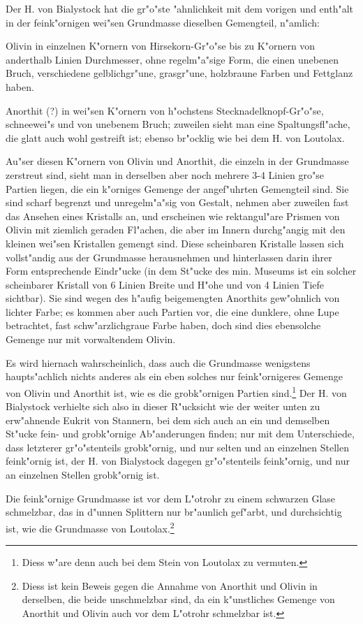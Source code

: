 \documentclass[a4paper, 11pt, oneside]{article}
\begin{document}
Der H. von Bialystock hat die gr"o"ste "ahnlichkeit mit dem vorigen und enth"alt in der feink"ornigen wei"sen Grundmasse dieselben Gemengteil, n"amlich:

Olivin in einzelnen K"ornern von Hirsekorn-Gr"o"se bis zu K"ornern von anderthalb Linien Durchmesser, ohne regelm"a"sige Form, die einen unebenen Bruch, verschiedene gelblichgr"une, grasgr"une, holzbraune Farben und Fettglanz haben.

Anorthit (?) in wei"sen K"ornern von h"ochstens Stecknadelknopf-Gr"o"se, schneewei"s und von unebenem Bruch; zuweilen sieht man eine Spaltungsfl"ache, die glatt auch wohl gestreift ist; ebenso br"ocklig wie bei dem H. von Loutolax.

Au"ser diesen K"ornern von Olivin und Anorthit, die einzeln in der Grundmasse zerstreut sind, sieht man in derselben aber noch mehrere 3-4 Linien gro"se Partien liegen, die ein k"orniges Gemenge der angef"uhrten Gemengteil sind. Sie sind scharf begrenzt und unregelm"a"sig von Gestalt, nehmen aber zuweilen fast das Ansehen eines Kristalls an, und erscheinen wie rektangul"are Prismen von Olivin mit ziemlich geraden Fl"achen, die aber im Innern durchg"angig mit den kleinen wei"sen Kristallen gemengt sind. Diese scheinbaren Kristalle lassen sich vollst"andig aus der Grundmasse herausnehmen und hinterlassen darin ihrer Form entsprechende Eindr"ucke (in dem St"ucke des min. Museums ist ein solcher scheinbarer Kristall von 6 Linien Breite und H"ohe und von 4 Linien Tiefe sichtbar). Sie sind wegen des h"aufig beigemengten Anorthits gew"ohnlich von lichter Farbe; es kommen aber auch Partien vor, die eine dunklere, ohne Lupe betrachtet, fast schw"arzlichgraue Farbe haben, doch sind dies ebensolche Gemenge nur mit vorwaltendem Olivin.

Es wird hiernach wahrscheinlich, dass auch die Grundmasse wenigstens haupts"achlich nichts anderes als ein eben solches nur feink"ornigeres Gemenge von Olivin und Anorthit ist, wie es die grobk"ornigen Partien sind.\footnote{Diess w"are denn auch bei dem Stein von Loutolax zu vermuten.} Der H. von Bialystock verhielte sich also in dieser R"ucksicht wie der weiter unten zu erw"ahnende Eukrit von Stannern, bei dem sich auch an ein und demselben St"ucke fein- und grobk"ornige Ab"anderungen finden; nur mit dem Unterschiede, dass letzterer gr"o"stenteils grobk"ornig, und nur selten und an einzelnen Stellen feink"ornig ist, der H. von Bialystock dagegen gr"o"stenteils feink"ornig, und nur an einzelnen Stellen grobk"ornig ist.

Die feink"ornige Grundmasse ist vor dem L"otrohr zu einem schwarzen Glase schmelzbar, das in d"unnen Splittern nur br"aunlich gef"arbt, und durchsichtig ist, wie die Grundmasse von Loutolax.\footnote{Diess ist kein Beweis gegen die Annahme von Anorthit und Olivin in derselben, die beide unschmelzbar sind, da ein k"unstliches Gemenge von Anorthit und Olivin auch vor dem L"otrohr schmelzbar ist.}
\end{document}
